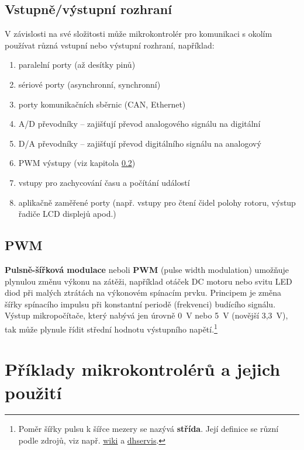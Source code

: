 \documentclass[12pt]{article}
\begin{document}
\subsection{Vstupně/výstupní rozhraní} \label{io}

V závislosti na své složitosti může mikrokontrolér pro komunikaci s okolím používat různá vstupní nebo výstupní rozhraní, například: 

\begin{enumerate}
	\item paralelní porty (až desítky pinů)
	\item sériové porty (asynchronní, synchronní)
	\item porty komunikačních sběrnic (CAN, Ethernet)
	\item A/D převodníky -- zajišťují převod analogového signálu na digitální
	\item D/A převodníky -- zajišťují převod digitálního signálu na analogový
	\item PWM výstupy (viz kapitola \ref{pwm})
	\item vstupy pro zachycování času a počítání událostí 
	\item aplikačně zaměřené porty (např. vstupy pro čtení čidel polohy rotoru, výstup řadiče LCD displejů apod.)		
\end{enumerate}  

\subsection{PWM} \label{pwm}

\textbf{Pulsně-šířková modulace} neboli \textbf{PWM}  (pulse width modulation) umož\-ňu\-je plynulou změnu výkonu na zátěži, například 
 otáček DC motoru nebo svitu LED diod při malých ztrátách na výkonovém spínacím prvku. 
 Principem je změna šířky spínacího impulsu při konstantní periodě (frekvenci) budícího signálu. 
 Výstup mikropočítače, který nabývá jen úrovně 0~V nebo 5~V (novější 3,3~V), tak může plynule řídit střední hodnotu výstupního napětí.\footnote{Poměr šířky pulsu k šířce mezery se nazývá \textbf{střída}. Její definice se různí podle zdrojů, viz např.
\href{https://cs.wikipedia.org/wiki/St\%C5\%99\%C3\%ADda\_sign\%C3\%A1lu}{wiki} 
	a \href{http://www.dhservis.cz/psm.htm}{dhservis}.}
 

\section{Příklady mikrokontrolérů a jejich použití}
\end{document}
